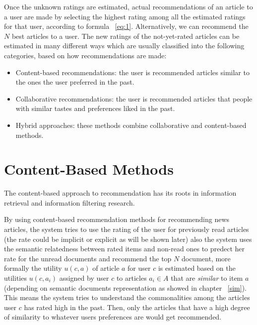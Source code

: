 Once the unknown ratings are estimated, actual recommendations of an article to a user are made by selecting the highest rating among all the estimated ratings for that user, according to formula ~\ref{eq:1}. Alternatively, we can recommend the $N$ best articles to a user.
The new ratings of the not-yet-rated articles can be estimated in many different ways which are usually classified into the following categories, based on how recommendations are made:
\begin{itemize}
	\item Content-based recommendations: the user is recommended articles similar to the ones the user preferred in the past.
	\item Collaborative recommendations: the user is recommended articles that people with similar tastes and preferences liked in the past.
	\item Hybrid approaches: these methods combine collaborative and content-based methods.
\end{itemize}


\section{Content-Based Methods}\label{content}
The content-based approach to recommendation has its roots in information retrieval \citep{recom_7} \citep{recom_89} and information filtering \citep{recom_10} research.

By using content-based recommendation methods for recommending news articles, the system tries to use the rating of the user for previously read articles (the rate could be implicit or explicit as will be shown later) also the system uses the semantic relatedness between rated items and non-read ones to predect her rate for the unread documents and recommend the top $N$ document, more formally the utility $u(c, a)$ of article $a$ for user $c$ is estimated based on the utilities $u(c ,a_i)$  assigned by user $c$ to articles $a_i \in A$ that are \textit{similar} to item $a$ (depending on semantic documents representation as showed in chapter ~\ref{sim}). This means the system tries to understand the commonalities among the articles user $c$ has rated high in the past. Then, only the articles that have a high degree of similarity to whatever users preferences are would get recommended.

